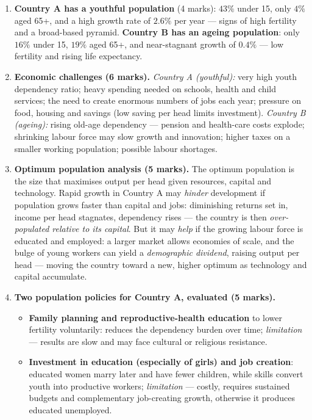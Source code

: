 \documentclass[11pt]{article}
\begin{document}
\begin{corrige}
\begin{enumerate}
\item \textbf{Country A has a youthful population} (4 marks): $43\%$ under 15, only $4\%$ aged 65+, and a high growth rate of $2.6\%$ per year — signs of high fertility and a broad-based pyramid. \textbf{Country B has an ageing population}: only $16\%$ under 15, $19\%$ aged 65+, and near-stagnant growth of $0.4\%$ — low fertility and rising life expectancy.
\item \textbf{Economic challenges (6 marks).} \emph{Country A (youthful):} very high youth dependency ratio; heavy spending needed on schools, health and child services; the need to create enormous numbers of jobs each year; pressure on food, housing and savings (low saving per head limits investment). \emph{Country B (ageing):} rising old-age dependency — pension and health-care costs explode; shrinking labour force may slow growth and innovation; higher taxes on a smaller working population; possible labour shortages.
\item \textbf{Optimum population analysis (5 marks).} The optimum population is the size that maximises output per head given resources, capital and technology. Rapid growth in Country A may \emph{hinder} development if population grows faster than capital and jobs: diminishing returns set in, income per head stagnates, dependency rises — the country is then \emph{over-populated relative to its capital}. But it may \emph{help} if the growing labour force is educated and employed: a larger market allows economies of scale, and the bulge of young workers can yield a \emph{demographic dividend}, raising output per head — moving the country toward a new, higher optimum as technology and capital accumulate.
\item \textbf{Two population policies for Country A, evaluated (5 marks).}
\begin{itemize}
\item \textbf{Family planning and reproductive-health education} to lower fertility voluntarily: reduces the dependency burden over time; \emph{limitation} — results are slow and may face cultural or religious resistance.
\item \textbf{Investment in education (especially of girls) and job creation}: educated women marry later and have fewer children, while skills convert youth into productive workers; \emph{limitation} — costly, requires sustained budgets and complementary job-creating growth, otherwise it produces educated unemployed.
\end{itemize}
\end{enumerate}
\end{corrige}
\end{document}

